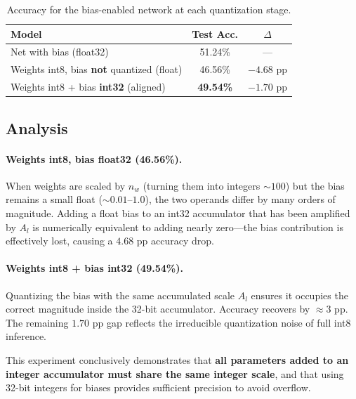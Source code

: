 \documentclass[11pt, letterpaper]{article}
\begin{document}
\begin{table}[H]
  \centering
  \caption{Accuracy for the bias-enabled network at each quantization stage.}
  \label{tab:bias}
  \begin{tabular}{lcc}
    \toprule
    \textbf{Model}                                       & \textbf{Test Acc.} & \textbf{$\Delta$} \\
    \midrule
    Net with bias (float32)                              & 51.24\%   & ---         \\
    Weights int8, bias \textbf{not} quantized (float)   & 46.56\%   & $-4.68$ pp  \\
    Weights int8 + bias \textbf{int32} (aligned)        & \textbf{49.54\%}  & $-1.70$ pp  \\
    \bottomrule
  \end{tabular}
\end{table}

\subsection{Analysis}

\paragraph{Weights int8, bias float32 (46.56\%).}
When weights are scaled by $n_w$ (turning them into integers $\sim100$) but the
bias remains a small float ($\sim0.01$--$1.0$), the two operands differ by many
orders of magnitude. Adding a float bias to an int32 accumulator that has been
amplified by $A_l$ is numerically equivalent to adding nearly zero---the bias
contribution is effectively lost, causing a $4.68$ pp accuracy drop.

\paragraph{Weights int8 + bias int32 (49.54\%).}
Quantizing the bias with the same accumulated scale $A_l$ ensures it occupies
the correct magnitude inside the 32-bit accumulator. Accuracy recovers by
$\approx3$ pp. The remaining $1.70$ pp gap reflects the irreducible quantization
noise of full int8 inference.

This experiment conclusively demonstrates that \textbf{all parameters added to
an integer accumulator must share the same integer scale}, and that using 32-bit
integers for biases provides sufficient precision to avoid overflow.

\end{document}
